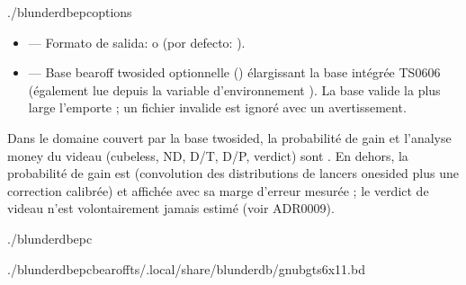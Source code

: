\documentclass[letterpaper,10pt,spanish]{sphinxmanual}
\begin{document}
\begin{sphinxVerbatim}[commandchars=\\\{\}]
./blunderdbepc\PYG{o}{[}options\PYG{o}{]}
\end{sphinxVerbatim}

\sphinxAtStartPar
{}
\begin{itemize}
\item {} 
\sphinxAtStartPar
{} — Formato de salida:  o  (por defecto: ).

\item {} 
\sphinxAtStartPar
{} — Base bearoff two\sphinxhyphen{}sided optionnelle () élargissant
la base intégrée TS\sphinxhyphen{}06\sphinxhyphen{}06 (également lue depuis la variable d’environnement
). La base valide la plus large l’emporte ; un fichier
invalide est ignoré avec un avertissement.

\end{itemize}

\sphinxAtStartPar
{} Dans le domaine couvert par la base two\sphinxhyphen{}sided, la probabilité de
gain et l’analyse money du videau (cubeless, ND, D/T, D/P, verdict) sont
. En dehors, la probabilité de gain est  (convolution
des distributions de lancers one\sphinxhyphen{}sided plus une correction calibrée) et
affichée avec sa marge d’erreur mesurée ; le verdict de videau n’est
volontairement jamais estimé (voir ADR\sphinxhyphen{}0009).

\sphinxAtStartPar
{}

\begin{sphinxVerbatim}[commandchars=\\\{\}]
./blunderdbepc

./blunderdbepc\PYGZhy{}\PYGZhy{}bearoff\PYGZhy{}ts\PYGZti{}/.local/share/blunderdb/gnubg\PYGZus{}ts6x11.bd
\end{sphinxVerbatim}
\end{document}
